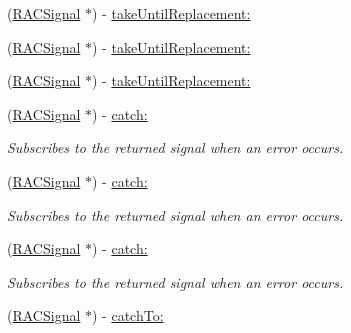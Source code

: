 \begin{DoxyCompactItemize}
(\mbox{\hyperlink{interface_r_a_c_signal}{R\+A\+C\+Signal}} $\ast$) -\/ \mbox{\hyperlink{interface_r_a_c_signal_aa8536c9726338e10176997936be011ed}{take\+Until\+Replacement\+:}}
\item 
(\mbox{\hyperlink{interface_r_a_c_signal}{R\+A\+C\+Signal}} $\ast$) -\/ \mbox{\hyperlink{interface_r_a_c_signal_aa8536c9726338e10176997936be011ed}{take\+Until\+Replacement\+:}}
\item 
(\mbox{\hyperlink{interface_r_a_c_signal}{R\+A\+C\+Signal}} $\ast$) -\/ \mbox{\hyperlink{interface_r_a_c_signal_aa8536c9726338e10176997936be011ed}{take\+Until\+Replacement\+:}}
\item 
\mbox{\label{interface_r_a_c_signal_a34c8a85e28adb1f26fcd769de19bc5bb}} 
(\mbox{\hyperlink{interface_r_a_c_signal}{R\+A\+C\+Signal}} $\ast$) -\/ \mbox{\hyperlink{interface_r_a_c_signal_a34c8a85e28adb1f26fcd769de19bc5bb}{catch\+:}}
\begin{DoxyCompactList}\small\item\em Subscribes to the returned signal when an error occurs. \end{DoxyCompactList}\item 
\mbox{\label{interface_r_a_c_signal_a34c8a85e28adb1f26fcd769de19bc5bb}} 
(\mbox{\hyperlink{interface_r_a_c_signal}{R\+A\+C\+Signal}} $\ast$) -\/ \mbox{\hyperlink{interface_r_a_c_signal_a34c8a85e28adb1f26fcd769de19bc5bb}{catch\+:}}
\begin{DoxyCompactList}\small\item\em Subscribes to the returned signal when an error occurs. \end{DoxyCompactList}\item 
\mbox{\label{interface_r_a_c_signal_a34c8a85e28adb1f26fcd769de19bc5bb}} 
(\mbox{\hyperlink{interface_r_a_c_signal}{R\+A\+C\+Signal}} $\ast$) -\/ \mbox{\hyperlink{interface_r_a_c_signal_a34c8a85e28adb1f26fcd769de19bc5bb}{catch\+:}}
\begin{DoxyCompactList}\small\item\em Subscribes to the returned signal when an error occurs. \end{DoxyCompactList}\item 
\mbox{\label{interface_r_a_c_signal_a0b1efe6d0548703cb25b8e436532e574}} 
(\mbox{\hyperlink{interface_r_a_c_signal}{R\+A\+C\+Signal}} $\ast$) -\/ \mbox{\hyperlink{interface_r_a_c_signal_a0b1efe6d0548703cb25b8e436532e574}{catch\+To\+:}}

\end{DoxyCompactItemize}
